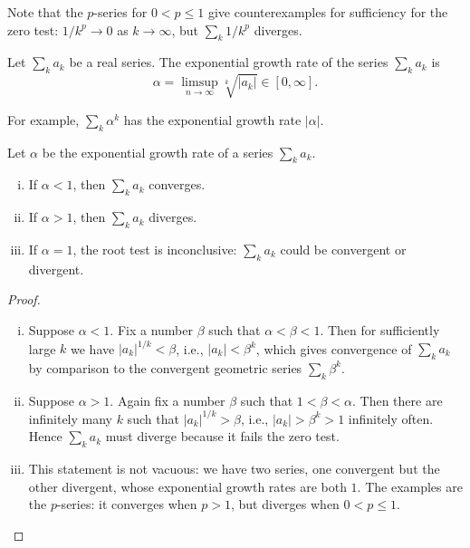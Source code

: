 \documentclass[11pt]{article}
\begin{document}
Note that the $p$-series for $0 < p \leqslant 1$ give counterexamples for sufficiency for the zero test: $1/k^p \to 0$ as $k \to \infty$, but $\sum_k 1/k^p$ diverges.

\begin{defn}
  Let $\sum_k a_k$ be a real series.
  The \textsf{exponential growth rate} of the series $\sum_k a_k$ is
  \[
    \alpha = \limsup_{n\to\infty} \sqrt[k]{|a_k|} \in [0,\infty].
  \]
\end{defn}

For example, $\sum_k \alpha^k$ has the exponential growth rate $|\alpha|$.

\begin{thm}
  Let $\alpha$ be the exponential growth rate of a series $\sum_k a_k$.
  \begin{enumerate}[(i)]
    \item If $\alpha < 1$, then $\sum_k a_k$ converges.

    \item If $\alpha > 1$, then $\sum_k a_k$ diverges.

    \item If $\alpha = 1$, the root test is inconclusive: $\sum_k a_k$ could be convergent or divergent.
  \end{enumerate}
\end{thm}

\begin{proof}
  \begin{enumerate}[(i)]
    \item Suppose $\alpha < 1$.  Fix a number $\beta$ such that $\alpha < \beta < 1$.
      Then for sufficiently large $k$ we have $|a_k|^{1/k} < \beta$, i.e., $|a_k| < \beta^k$, which gives convergence of $\sum_k a_k$ by comparison to the convergent geometric series $\sum_k \beta^k$.

    \item Suppose $\alpha > 1$.  Again fix a number $\beta$ such that $1 < \beta < \alpha$.  Then there are infinitely many $k$ such that $|a_k|^{1/k} > \beta$, i.e., $|a_k| > \beta^k > 1$ infinitely often.
      Hence $\sum_k a_k$ must diverge because it fails the zero test.
    
    \item This statement is not vacuous: we have two series, one convergent but the other divergent, whose exponential growth rates are both $1$.
      The examples are the $p$-series: it converges when $p > 1$, but diverges when $0 < p \leqslant 1$.
  \end{enumerate}
\end{proof}
\end{document}
